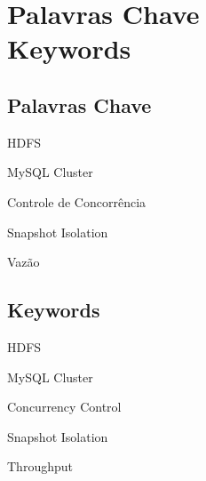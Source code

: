 \newpage


\chapter*{Palavras Chave \\ Keywords}
\thispagestyle{empty}

\section*{Palavras Chave}
{\large %

\noindent HDFS

\noindent MySQL Cluster

\noindent Controle de Concorrência

\noindent Snapshot Isolation

\noindent Vazão

}

\section*{Keywords}

{\large %

\noindent HDFS

\noindent MySQL Cluster

\noindent Concurrency Control

\noindent Snapshot Isolation

\noindent Throughput

}

\vfill

\cleardoublepage



\pagestyle{plain}



\def\contentsname{Index}
\tableofcontents
\newpage

\listoffigures
\newpage

\listoftables

\cleardoublepage


